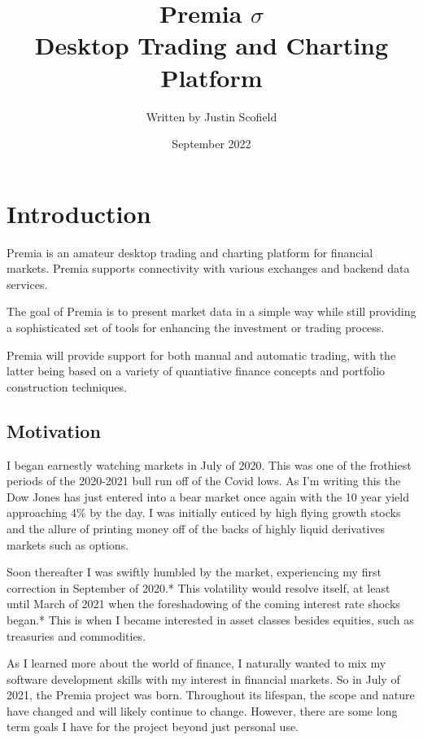 \documentclass[12pt, oneside]{report}
\title{Premia $\sigma$ \\
\large Desktop Trading and Charting Platform}
\author{Written by Justin Scofield}
\date{\small September 2022}
\begin{document}
\maketitle
{}

\tableofcontents

\chapter{Introduction}

Premia is an amateur desktop trading and charting platform for  financial markets. Premia supports connectivity with various exchanges and backend data services. 

The goal of Premia is to present market data in a simple way while still providing a sophisticated set of tools for enhancing the investment or trading process.

Premia will provide support for both manual and automatic trading, with the latter being based on a variety of quantiative finance concepts and portfolio construction techniques.

\section{Motivation}

I began earnestly watching markets in July of 2020. This was one of the frothiest periods of the 2020-2021 bull run off of the Covid lows. As I'm writing this the Dow Jones has just entered into a bear market once again with the 10 year yield approaching 4\% by the day. I was initially enticed by high flying growth stocks and the allure of printing money off of the backs of highly liquid derivatives markets such as options. 

Soon thereafter I was swiftly humbled by the market, experiencing my first correction in September of 2020.* This volatility would resolve itself, at least until March of 2021 when the foreshadowing of the coming interest rate shocks began.* This is when I became interested in asset classes besides equities, such as treasuries and commodities. 

As I learned more about the world of finance, I naturally wanted to mix my software development skills with my interest in financial markets. So in July of 2021, the Premia project was born. Throughout its lifespan, the scope and nature have changed and will likely continue to change. However, there are some long term goals I have for the project beyond just personal use. 
\end{document}
